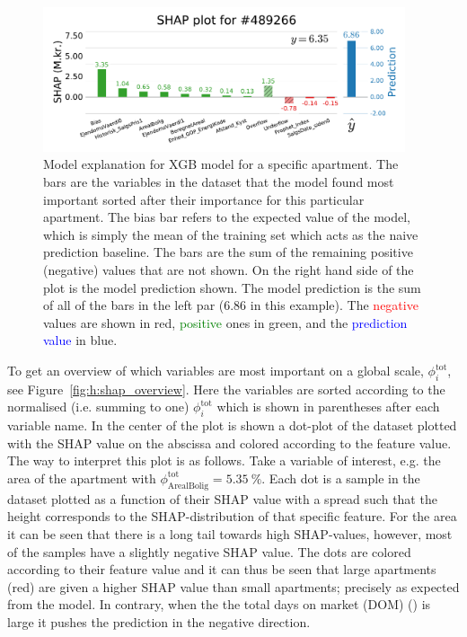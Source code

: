 \begin{figure}[ht!]
  \includegraphics[width=0.95\textwidth, trim=0 0 0 40, clip]{figures/housing/Ejerlejlighed_v19_cut_all_Ncols_all_SHAP_fig_loc=489266.pdf}
  \caption[SHAP Prediction Explanation for apartment]
          {Model explanation for XGB model for a specific apartment. The bars are the variables in the dataset that the model found most important sorted after their importance for this particular apartment. The bias bar refers to the expected value of the model, which is simply the mean of the training set which acts as the naive prediction baseline. The  bars are the sum of the remaining positive (negative) values that are not shown. On the right hand side of the plot is the model prediction shown. The model prediction is the sum of all of the bars in the left par (\SI{6.86}{\Mkr} in this example). The \textcolor{red}{negative} values are shown in red, \textcolor{green}{positive} ones in green, and the \textcolor{blue}{prediction value} in blue. 
          } 
  \label{fig:h:shap_single_apartment}
\end{figure}

To get an overview of which variables are most important on a global scale, $\phi_i^\mathrm{tot}$, see Figure~\ref{fig:h:shap_overview}. Here the variables are sorted according to the normalised (i.e. summing to one) $\phi_i^\mathrm{tot}$ which is shown in parentheses after each variable name. In the center of the plot is shown a dot-plot of the dataset plotted with the SHAP value on the abscissa and colored according to the feature value. 
The way to interpret this plot is as follows. Take a variable of interest, e.g. the area of the apartment  with $\phi_\mathrm{ArealBolig}^\mathrm{tot}=\SI{5.35}{\percent}$. Each dot is a sample in the dataset plotted as a function of their SHAP value with a spread such that the height corresponds to the SHAP-distribution of that specific feature. For the area it can be seen that there is a long tail towards high SHAP-values, however, most of the samples have a slightly negative SHAP value. The dots are colored according to their feature value and it can thus be seen that large apartments (red) are given a higher SHAP value than small apartments; precisely as expected from the model. In contrary, when the the total days on market (DOM) () is large it pushes the prediction in the negative direction. 

